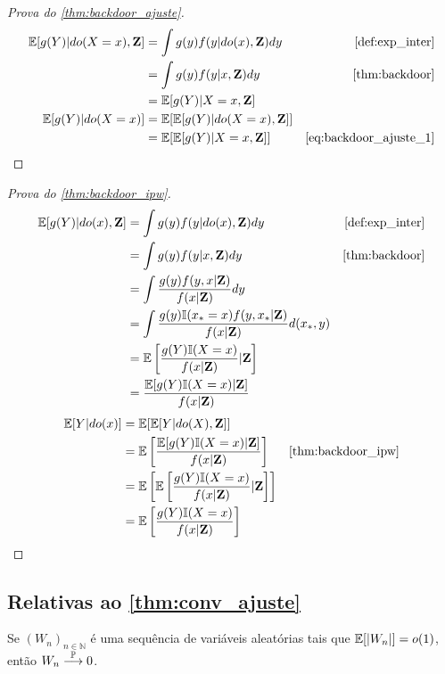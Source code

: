 \begin{proof}[Prova do \cref{thm:backdoor_ajuste}]
 \begin{align}
  \label{eq:backdoor_ajuste_1}
  \E[g(Y)|do(X=x),\Z]
  &= \int g(y) f(y|do(x),\Z) dy 
  & \text{\cref{def:exp_inter}} \nonumber \\
  &= \int g(y) f(y|x, \Z)dy 
  & \text{\cref{thm:backdoor}} \nonumber \\
  &= \E[g(Y)|X=x,\Z] \\
  \E[g(Y)|do(X=x)]
  &= \E[\E[g(Y)|do(X=x),\Z]] \nonumber \\
  &= \E[\E[g(Y)|X=x,\Z]]
  & \text{\cref{eq:backdoor_ajuste_1}} \nonumber
 \end{align}
\end{proof}

\begin{proof}[Prova do \cref{thm:backdoor_ipw}]
 \begin{align*}
  \E[g(Y)|do(x),\Z]
  &= \int g(y) f(y|do(x),\Z) dy
  & \text{\cref{def:exp_inter}} \\
  &= \int g(y) f(y|x,\Z) dy
  & \text{\cref{thm:backdoor}} \\
  &= \int \frac{g(y) f(y,x|\Z)}{f(x|\Z)} dy \\
  &= \int \frac{g(y) \I(x_* = x) f(y,x_*|\Z)}{f(x|\Z)} d(x_*, y) \\
  &= \E\left[\frac{g(Y)\I(X=x)}{f(x|\Z)}|\Z\right] \\
  &= \frac{\E[g(Y)\I(X=x)|\Z]}{f(x|\Z)}
 \end{align*}
 \begin{align*}
  \E[Y|do(x)]
  &= \E[\E[Y|do(X),\Z]] \\
  &= \E\left[\frac{\E[g(Y)\I(X=x)|\Z]}{f(x|\Z)}\right] 
  & \text{\cref{thm:backdoor_ipw}} \\
  &= \E\left[\E\left[\frac{g(Y)\I(X=x)}{f(x|\Z)}|\Z\right]\right] \\
  &= \E\left[\frac{g(Y)\I(X=x)}{f(x|\Z)}\right]
 \end{align*}
\end{proof}

\subsection{Relativas ao \cref{thm:conv_ajuste}}

\begin{lemma}
 \label{lemma:conv_l1_to_p}
 Se $(W_n)_{n \in \mathbb{N}}$ é uma sequência de
 variáveis aleatórias tais que ${\mathbb E}[|W_n|] = o(1)$,
 então $W_n \stackrel{{\mathbb P}}{\longrightarrow} 0$.
\end{lemma}

